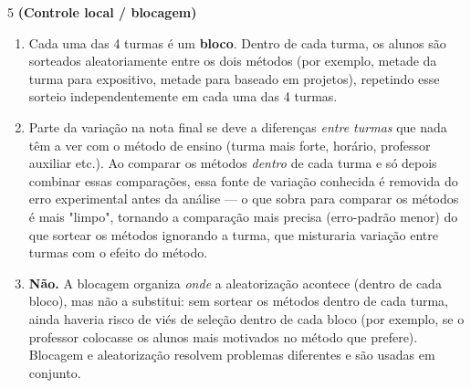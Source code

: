 \documentclass[11pt]{article}
\begin{document}
\begin{questao}{5} \textbf{(Controle local / blocagem)}
\end{questao}
\begin{solucao}
\begin{enumerate}[label=(\alph*)]
  \item Cada uma das 4 turmas é um \textbf{bloco}. Dentro de cada turma, os alunos são
    sorteados aleatoriamente entre os dois métodos (por exemplo, metade da turma para
    expositivo, metade para baseado em projetos), repetindo esse sorteio independentemente em
    cada uma das 4 turmas.
  \item Parte da variação na nota final se deve a diferenças \emph{entre turmas} que nada têm a
    ver com o método de ensino (turma mais forte, horário, professor auxiliar etc.). Ao comparar
    os métodos \emph{dentro} de cada turma e só depois combinar essas comparações, essa fonte de
    variação conhecida é removida do erro experimental antes da análise — o que sobra para
    comparar os métodos é mais "limpo", tornando a comparação mais precisa (erro-padrão menor)
    do que sortear os métodos ignorando a turma, que misturaria variação entre turmas com o
    efeito do método.
  \item \textbf{Não.} A blocagem organiza \emph{onde} a aleatorização acontece (dentro de cada
    bloco), mas não a substitui: sem sortear os métodos dentro de cada turma, ainda haveria risco
    de viés de seleção dentro de cada bloco (por exemplo, se o professor colocasse os alunos mais
    motivados no método que prefere). Blocagem e aleatorização resolvem problemas diferentes e
    são usadas em conjunto.
\end{enumerate}
\end{solucao}
\end{document}
